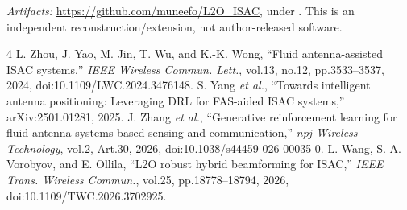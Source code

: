 \documentclass[10pt,journal,onecolumn,draftclsnofoot]{IEEEtran}
\begin{document}
\noindent\emph{Artifacts:} \url{https://github.com/muneefo/L2O_ISAC}, under . This is an independent reconstruction/extension, not author-released software.
\begin{thebibliography}{4}
 L. Zhou, J. Yao, M. Jin, T. Wu, and K.-K. Wong, ``Fluid antenna-assisted ISAC systems,'' \emph{IEEE Wireless Commun. Lett.}, vol.13, no.12, pp.3533--3537, 2024, doi:10.1109/LWC.2024.3476148.
 S. Yang \emph{et al.}, ``Towards intelligent antenna positioning: Leveraging DRL for FAS-aided ISAC systems,'' arXiv:2501.01281, 2025.
 J. Zhang \emph{et al.}, ``Generative reinforcement learning for fluid antenna systems based sensing and communication,'' \emph{npj Wireless Technology}, vol.2, Art.30, 2026, doi:10.1038/s44459-026-00035-0.
 L. Wang, S. A. Vorobyov, and E. Ollila, ``L2O robust hybrid beamforming for ISAC,'' \emph{IEEE Trans. Wireless Commun.}, vol.25, pp.18778--18794, 2026, doi:10.1109/TWC.2026.3702925.
\end{thebibliography}
\end{document}
